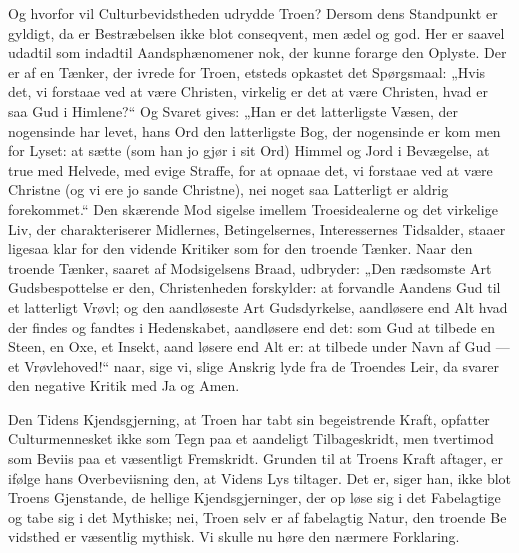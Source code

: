 \documentclass[12pt]{book}
\newcommand{\opage}[1]{\marginnote{\footnotesize\textit{[#1]}}}
\begin{document}
Og hvorfor vil Culturbevidstheden udrydde Troen?
Dersom dens Standpunkt er gyldigt, da er Bestræbelsen
ikke blot conseqvent, men ædel og god. Her er saavel
udadtil som indadtil Aandsphænomener nok, der kunne
forarge den Oplyste. Der er af en Tænker, der ivrede
for Troen, etsteds opkastet det Spørgsmaal: „Hvis det,
vi forstaae ved at være Christen, virkelig er det at være
Christen, hvad er saa Gud i Himlene?“ Og Svaret gives:
„Han er det latterligste Væsen, der nogensinde har levet,
hans Ord den latterligste Bog, der nogensinde er kom\-%
men for Lyset: at sætte (som han jo gjør i sit Ord)
Himmel og Jord i Bevægelse, at true med Helvede, med
evige Straffe, for at opnaae det, vi forstaae ved at være
Christne (og vi ere jo sande Christne), nei noget saa
Latterligt er aldrig forekommet.“ Den skærende Mod\-%
sigelse imellem Troesidealerne og det virkelige Liv, der
charakteriserer Midlernes, Betingelsernes, Interessernes
\opage{92}\setcounter{footnote}{0}%
Tidsalder, staaer ligesaa klar for den vidende Kritiker
som for den troende Tænker. Naar den troende Tænker,
saaret af Modsigelsens Braad, udbryder: „Den rædsomste
Art Gudsbespottelse er den, Christenheden forskylder:
at forvandle Aandens Gud til et latterligt Vrøvl; og den
aandløseste Art Gudsdyrkelse, aandløsere end Alt hvad
der findes og fandtes i Hedenskabet, aandløsere end det:
som Gud at tilbede en Steen, en Oxe, et Insekt, aand\-%
løsere end Alt er: at tilbede under Navn af Gud --- et
Vrøvlehoved!“ naar, sige vi, slige Anskrig lyde fra de
Troendes Leir, da svarer den negative Kritik med Ja
og Amen.

Den Tidens Kjendsgjerning, at Troen har tabt sin
begeistrende Kraft, opfatter Culturmennesket ikke som
Tegn paa et aandeligt Tilbageskridt, men tvertimod som
Beviis paa et væsentligt Fremskridt. Grunden til at
Troens Kraft aftager, er ifølge hans Overbeviisning den,
at Videns Lys tiltager. Det er, siger han, ikke blot
Troens Gjenstande, de hellige Kjendsgjerninger, der op\-%
løse sig i det Fabelagtige og tabe sig i det Mythiske;
nei, Troen selv er af fabelagtig Natur, den troende Be\-%
vidsthed er væsentlig mythisk. Vi skulle nu høre den
nærmere Forklaring.
\end{document}
